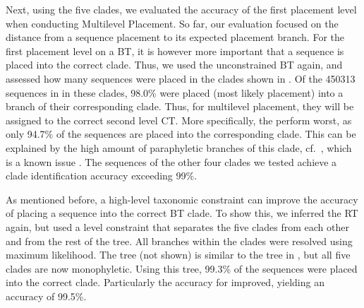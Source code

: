 Next, using the five clades, we evaluated the accuracy of the first placement level when conducting Multilevel Placement.
So far, our evaluation focused on the distance from a sequence placement to its expected placement branch.
For the first placement level on a \acf{BT}, it is however more important that a sequence is placed into the correct clade.
Thus, we used the unconstrained  \ac{BT} again,
and assessed how many sequences were placed in the clades shown in .
Of the \num{450 313} sequences in  in these clades, %
98.0\% were placed (most likely placement) into a branch of their corresponding clade.
Thus, for multilevel placement, they will be assigned to the correct second level \acf{CT}.
More specifically, the  perform worst,
as only 94.7\% of the  sequences are placed into the corresponding clade.
This can be explained by the high amount of paraphyletic branches of this clade, cf.~,
which is a known issue \citep{Parks2018}. %
The sequences of the other four clades we tested achieve a clade identification accuracy exceeding 99\%.


As mentioned before, %
a high-level taxonomic constraint can improve the accuracy of placing a sequence into the correct \ac{BT} clade.
To show this, we inferred the  \ac{RT} again,
but used a  level constraint
that separates the five clades from each other and from the rest of the tree.
All branches within the clades were resolved using maximum likelihood.
The tree (not shown)  is similar to the tree in , but all five clades are now monophyletic.
Using this tree, 99.3\% of the sequences were placed into the correct clade.
Particularly the accuracy for  improved, yielding an accuracy of 99.5\%.

